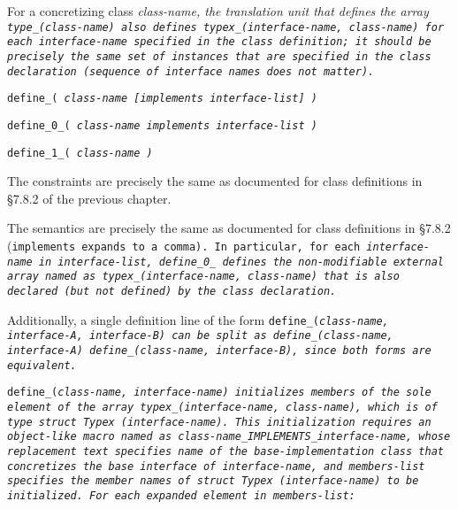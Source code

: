 For a concretizing class \it{class-name}, the translation unit that
defines the array \tt{type_(}\it{class-name}\tt{)} also defines
\tt{typex_(}\it{interface-name}\tt{,} \it{class-name}\tt{)} for each
\it{interface-name} specified in the class definition;
it should be precisely the same set of instances that are specified in
the class declaration (sequence of interface names does not matter).


\tt{define_}\s\s\s\tt{(} \it{class-name} [\tt{implements} \it{interface-list}] \tt{)}

\tt{define_0_}\s\tt{(} \it{class-name} \phantom{[}\tt{implements} \it{interface-list}\phantom{]} \tt{)}

\tt{define_1_}\s\tt{(} \it{class-name} \tt{)}


The constraints are precisely the same as documented for
class definitions in \S 7.8.2 of the previous chapter.


The semantics are precisely the same as documented for class
definitions in \S 7.8.2 (\tt{implements} expands to a comma).
In particular, for each \it{interface-name} in \it{interface-list},
\tt{define_0_} defines the non-modifiable external array named as
\tt{typex_(}\it{interface-name}\tt{,} \it{class-name}\tt{)} that
is also declared (but not defined) by the class declaration.

Additionally, a single definition line of the form
\tt{define_(}\it{class-name}\tt{,} \it{interface-A}\tt{,} \it{interface-B}\tt{)}
can be split as \tt{define_(}\it{class-name}\tt{,} \it{interface-A}\tt{)}
\tt{define_(}\it{class-name}\tt{,} \it{interface-B}\tt{)},
since both forms are equivalent.

\tt{define_(}\it{class-name}\tt{,} \it{interface-name}\tt{)}
initializes members of the sole element of the array
\tt{typex_(}\it{interface-name}, \it{class-name}\tt{)},
which is of type \tt{struct Typex (}\it{interface-name}\tt{)}.
This initialization requires an object-like macro named as
\it{class-name}\tt{_IMPLEMENTS_}\it{interface-name}, whose replacement text
specifies name of the \it{base-implementation} class that concretizes the base
interface of \it{interface-name}, and \it{members-list} specifies the member
names of \tt{struct Typex (}\it{interface-name}\tt{)} to be initialized.
For each expanded element in \it{members-list}:

